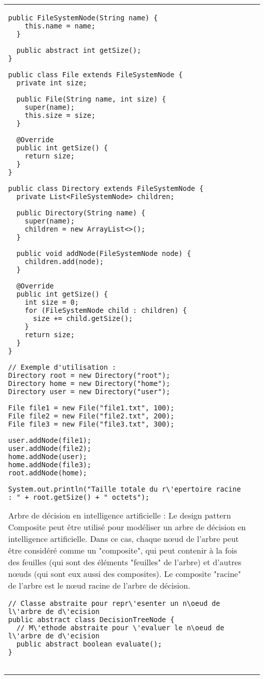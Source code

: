 \begin{table}[H]
\begin{adjustbox}{max width=\textwidth}
\begin{tabular}{l|p{\textwidth}}
\begin{minipage}[tl]{0.5\textwidth}
\begin{minipage}[b]{1\textwidth}
\begin{lstlisting}[style=monstyle]
  public FileSystemNode(String name) {
    this.name = name;
  }

  public abstract int getSize();
}

public class File extends FileSystemNode {
  private int size;

  public File(String name, int size) {
    super(name);
    this.size = size;
  }

  @Override
  public int getSize() {
    return size;
  }
}

public class Directory extends FileSystemNode {
  private List<FileSystemNode> children;

  public Directory(String name) {
    super(name);
    children = new ArrayList<>();
  }

  public void addNode(FileSystemNode node) {
    children.add(node);
  }

  @Override
  public int getSize() {
    int size = 0;
    for (FileSystemNode child : children) {
      size += child.getSize();
    }
    return size;
  }
}

// Exemple d'utilisation :
Directory root = new Directory("root");
Directory home = new Directory("home");
Directory user = new Directory("user");

File file1 = new File("file1.txt", 100);
File file2 = new File("file2.txt", 200);
File file3 = new File("file3.txt", 300);

user.addNode(file1);
user.addNode(file2);
home.addNode(user);
home.addNode(file3);
root.addNode(home);

System.out.println("Taille totale du r\'epertoire racine : " + root.getSize() + " octets");
\end{lstlisting}
\end{minipage}
\end{minipage}
\hspace{6mm}
\begin{minipage}[tr]{0.5\textwidth}
Arbre de décision en intelligence artificielle :
Le design pattern Composite peut être utilisé pour modéliser un arbre de décision en intelligence artificielle. Dans ce cas, chaque nœud de l'arbre peut être considéré comme un "composite", qui peut contenir à la fois des feuilles (qui sont des éléments "feuilles" de l'arbre) et d'autres nœuds (qui sont eux aussi des composites). Le composite "racine" de l'arbre est le nœud racine de l'arbre de décision.
\begin{lstlisting}[style=monstyle]
// Classe abstraite pour repr\'esenter un n\oeud de l\'arbre de d\'ecision
public abstract class DecisionTreeNode {
  // M\'ethode abstraite pour \'evaluer le n\oeud de l\'arbre de d\'ecision
  public abstract boolean evaluate();
}


\end{lstlisting}
\end{minipage}
\end{tabular}
\end{adjustbox}
\end{table}
